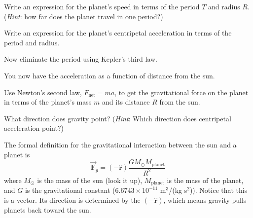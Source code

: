 \documentclass{handout}
\begin{document}
\begin{questions}
    \question Write an expression for the planet's speed in terms of the period $T$ and radius $R$. (\textit{Hint}: how far does the planet travel in one period?)

    \answerspace{1.2in}

    \question Write an expression for the planet's centripetal acceleration in terms of the period and radius. \label{accel}

    \answerspace{1.2in}

    \question Now eliminate the period using Kepler's third law.
    You now have the acceleration as a function of distance from the sun.

    \question Use Newton's second law, $F_\text{net}=ma$, to get the gravitational force on the planet in terms of the planet's mass $m$ and its distance $R$ from the sun. \label{gravForce}

    \answerspace{1.2in}

    \question What direction does gravity point? (\textit{Hint}: Which direction does centripetal acceleration point?)

    \answerspace{1in}

\end{questions}
\clearpage
The formal definition for the gravitational interaction between the sun and a planet is
$$
\vec{\boldsymbol{F}}_g=(-\hat{\boldsymbol{r}}) \frac{GM_\odot M_\text{planet}}{R^2}
$$
where $M_\odot$ is the mass of the sun (look it up), $M_\text{planet}$ is the mass of the planet, and $G$ is the gravitational constant ($6.6743\times 10^{-11}$ m$^3$/(kg s$^2$)). Notice that this is a vector. Its direction is determined by the $(-\hat{\boldsymbol{r}})$, which means gravity pulls planets back toward the sun.
\end{document}
